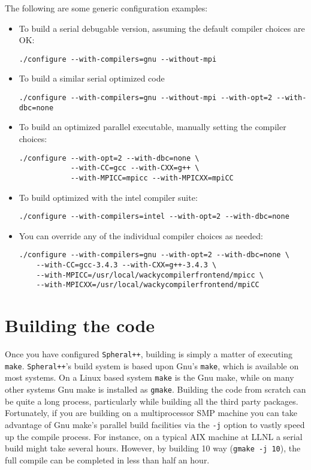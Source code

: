 \documentclass{article}
\newcommand{\Spheral}{{\tt Spheral++}}
\begin{document}
The following are some generic configuration examples:

\begin{itemize}
\item To build a serial debugable version, assuming the default compiler choices
are OK:
\begin{verbatim}
./configure --with-compilers=gnu --without-mpi
\end{verbatim}

\item To build a similar serial optimized code
\begin{verbatim}
./configure --with-compilers=gnu --without-mpi --with-opt=2 --with-dbc=none
\end{verbatim}

\item To build an optimized parallel executable, manually setting the compiler
choices:
\begin{verbatim}
./configure --with-opt=2 --with-dbc=none \
            --with-CC=gcc --with-CXX=g++ \
            --with-MPICC=mpicc --with-MPICXX=mpiCC
\end{verbatim}

\item To build optimized with the intel compiler suite:
\begin{verbatim}
./configure --with-compilers=intel --with-opt=2 --with-dbc=none
\end{verbatim}

\item You can override any of the individual compiler choices as needed:
\begin{verbatim}
./configure --with-compilers=gnu --with-opt=2 --with-dbc=none \
    --with-CC=gcc-3.4.3 --with-CXX=g++-3.4.3 \
    --with-MPICC=/usr/local/wackycompilerfrontend/mpicc \
    --with-MPICXX=/usr/local/wackycompilerfrontend/mpiCC
\end{verbatim}

\end{itemize}

\section{Building the code}

Once you have configured \Spheral, building is simply a matter of executing {\tt
make}.  \Spheral's build system is based upon Gnu's \verb+make+, which is
available on most systems.  On a Linux based system \verb+make+ is the Gnu make,
while on many other systems Gnu make is installed as \verb+gmake+.  Building the
code from scratch can be quite a long process, particularly while building all
the third party packages.  Fortunately, if you are building on a multiprocessor
SMP machine you can take advantage of Gnu make's parallel build facilities via
the \verb+-j+ option to vastly speed up the compile process.  For instance, on a
typical AIX machine at LLNL a serial build might take several hours.  However,
by building 10 way (\verb+gmake -j 10+), the full compile can be completed in
less than half an hour.
\end{document}
